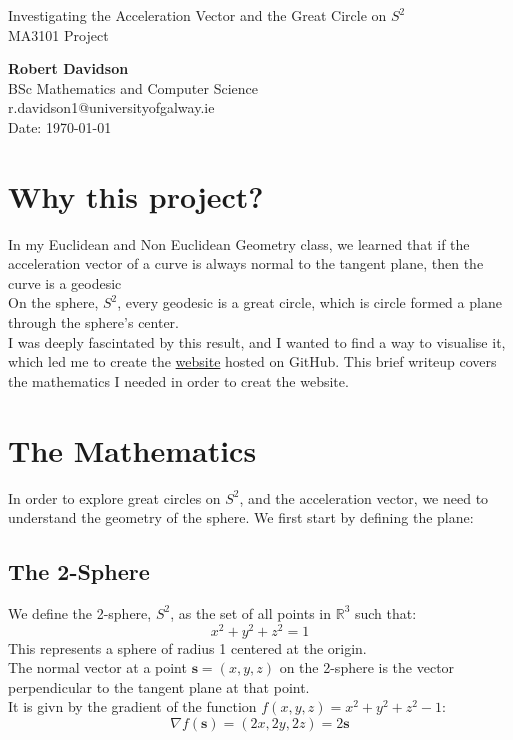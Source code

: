 \documentclass[9pt]{extarticle}
\begin{document}
\begin{center}
    \vspace{0.5cm}
    Investigating the Acceleration Vector and the Great Circle on $S^2$\\
    MA3101 Project\\[24pt]
    \LARGE

    \Large
    \textbf{Robert Davidson}\\[6pt]
    \small
    BSc Mathematics and Computer Science \\ r.davidson1@universityofgalway.ie\\[6pt]
    Date: \today\\[12pt]
\end{center}

\vspace{1.5cm}

\section{Why this project?}
In my Euclidean and Non Euclidean Geometry class, we learned that if the acceleration vector of a curve is always normal to the tangent plane, then the curve is a geodesic\\[0.5ex]
On the sphere, $S^2$, every geodesic is a great circle, which is circle formed a plane through the sphere's center. \\[0.5ex]
I was deeply fascintated by this result, and I wanted to find a way to visualise it, which led me to create the \href{https://robertdavidson1.github.io/MA3101Project/}{website} hosted on GitHub.
This brief writeup covers the mathematics I needed in order to creat the website.

\section{The Mathematics}
In order to explore great circles on $S^2$, and the acceleration vector, we need to understand the geometry of the sphere. We first start by defining the plane:
\subsection{The 2-Sphere}
We define the 2-sphere, $S^2$, as the set of all points in $\mathbb{R}^3$ such that:
$$x^2 + y^2 + z^2 = 1$$
This represents a sphere of radius 1 centered at the origin. \\[1ex]
The normal vector at a point $\mathbf{s} = (x, y, z)$ on the 2-sphere is the vector perpendicular to the tangent plane at that point. \\
It is givn by the gradient of the function $f(x,y,z) = x^2 + y^2 + z^2 - 1$:
$$\nabla f(\mathbf{s}) = (2x, 2y, 2z) = 2\textbf{s}$$
\end{document}
